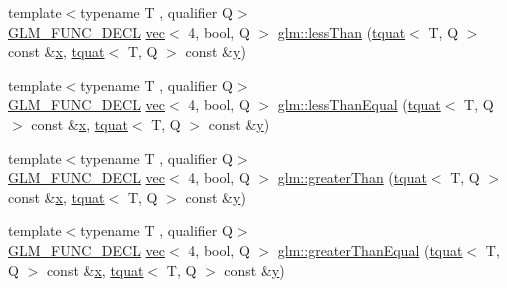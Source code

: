 \begin{DoxyCompactItemize}
\item 
{\footnotesize template$<$typename T , qualifier Q$>$ }\\\mbox{\hyperlink{setup_8hpp_ab2d052de21a70539923e9bcbf6e83a51}{G\+L\+M\+\_\+\+F\+U\+N\+C\+\_\+\+D\+E\+CL}} \mbox{\hyperlink{structglm_1_1vec}{vec}}$<$ 4, bool, Q $>$ \mbox{\hyperlink{group__gtc__quaternion_ga627487c769e33f4b9f318f271b75802c}{glm\+::less\+Than}} (\mbox{\hyperlink{structglm_1_1tquat}{tquat}}$<$ T, Q $>$ const \&\mbox{\hyperlink{_s_d_l__opengl_8h_ad0e63d0edcdbd3d79554076bf309fd47}{x}}, \mbox{\hyperlink{structglm_1_1tquat}{tquat}}$<$ T, Q $>$ const \&\mbox{\hyperlink{_s_d_l__opengl_8h_a1675d9d7bb68e1657ff028643b4037e3}{y}})
\item 
{\footnotesize template$<$typename T , qualifier Q$>$ }\\\mbox{\hyperlink{setup_8hpp_ab2d052de21a70539923e9bcbf6e83a51}{G\+L\+M\+\_\+\+F\+U\+N\+C\+\_\+\+D\+E\+CL}} \mbox{\hyperlink{structglm_1_1vec}{vec}}$<$ 4, bool, Q $>$ \mbox{\hyperlink{group__gtc__quaternion_ga9e84617bb109bf2eb7f30d7f4ba07ad4}{glm\+::less\+Than\+Equal}} (\mbox{\hyperlink{structglm_1_1tquat}{tquat}}$<$ T, Q $>$ const \&\mbox{\hyperlink{_s_d_l__opengl_8h_ad0e63d0edcdbd3d79554076bf309fd47}{x}}, \mbox{\hyperlink{structglm_1_1tquat}{tquat}}$<$ T, Q $>$ const \&\mbox{\hyperlink{_s_d_l__opengl_8h_a1675d9d7bb68e1657ff028643b4037e3}{y}})
\item 
{\footnotesize template$<$typename T , qualifier Q$>$ }\\\mbox{\hyperlink{setup_8hpp_ab2d052de21a70539923e9bcbf6e83a51}{G\+L\+M\+\_\+\+F\+U\+N\+C\+\_\+\+D\+E\+CL}} \mbox{\hyperlink{structglm_1_1vec}{vec}}$<$ 4, bool, Q $>$ \mbox{\hyperlink{group__gtc__quaternion_ga3f2720e2d77ec39186415f85ecd9cad0}{glm\+::greater\+Than}} (\mbox{\hyperlink{structglm_1_1tquat}{tquat}}$<$ T, Q $>$ const \&\mbox{\hyperlink{_s_d_l__opengl_8h_ad0e63d0edcdbd3d79554076bf309fd47}{x}}, \mbox{\hyperlink{structglm_1_1tquat}{tquat}}$<$ T, Q $>$ const \&\mbox{\hyperlink{_s_d_l__opengl_8h_a1675d9d7bb68e1657ff028643b4037e3}{y}})
\item 
{\footnotesize template$<$typename T , qualifier Q$>$ }\\\mbox{\hyperlink{setup_8hpp_ab2d052de21a70539923e9bcbf6e83a51}{G\+L\+M\+\_\+\+F\+U\+N\+C\+\_\+\+D\+E\+CL}} \mbox{\hyperlink{structglm_1_1vec}{vec}}$<$ 4, bool, Q $>$ \mbox{\hyperlink{group__gtc__quaternion_ga293cb3175d9ad290deaf50984716fd44}{glm\+::greater\+Than\+Equal}} (\mbox{\hyperlink{structglm_1_1tquat}{tquat}}$<$ T, Q $>$ const \&\mbox{\hyperlink{_s_d_l__opengl_8h_ad0e63d0edcdbd3d79554076bf309fd47}{x}}, \mbox{\hyperlink{structglm_1_1tquat}{tquat}}$<$ T, Q $>$ const \&\mbox{\hyperlink{_s_d_l__opengl_8h_a1675d9d7bb68e1657ff028643b4037e3}{y}})

\end{DoxyCompactItemize}

